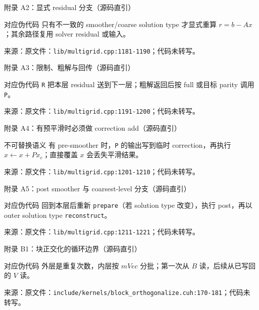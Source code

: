 \documentclass[UTF8,aspectratio=169,11pt]{ctexbeamer}
\newcommand{\source}[1]{\vspace{0.05em}\par{\raggedright\scriptsize\color{muted}来源：#1\par}}
\newcommand{\codepath}[1]{\nolinkurl{#1}}
\begin{document}
\begin{frame}[fragile,t]{附录 A2：显式 residual 分支（源码直引）}
  
  \begin{block}{对应伪代码}
    只有不一致的 smoother/coarse solution type 才显式重算 \(r=b-Ax\)；其余路径复用 solver residual 或输入。
  \end{block}
  \source{原文件：\codepath{lib/multigrid.cpp:1181-1190}；代码未转写。}
\end{frame}

\begin{frame}[fragile,t]{附录 A3：限制、粗解与回传（源码直引）}
  
  \begin{block}{对应伪代码}
    \texttt{R} 把本层 residual 送到下一层；粗解返回后按 full 或目标 parity 调用 \texttt{P}。
  \end{block}
  \source{原文件：\codepath{lib/multigrid.cpp:1191-1200}；代码未转写。}
\end{frame}

\begin{frame}[fragile,t]{附录 A4：有预平滑时必须做 correction add（源码直引）}
  
  \begin{alertblock}{不可替换语义}
    有 pre-smoother 时，\texttt{P} 的输出写到临时 correction，再执行 \(x\leftarrow x+Px_c\)；直接覆盖 \(x\) 会丢失平滑结果。
  \end{alertblock}
  \source{原文件：\codepath{lib/multigrid.cpp:1201-1210}；代码未转写。}
\end{frame}

\begin{frame}[fragile,t]{附录 A5：post smoother 与 coarsest-level 分支（源码直引）}
  
  \begin{block}{对应伪代码}
    回到本层后重新 \texttt{prepare}（若 solution type 改变），执行 post，再以 outer solution type \texttt{reconstruct}。
  \end{block}
  \source{原文件：\codepath{lib/multigrid.cpp:1211-1221}；代码未转写。}
\end{frame}

\begin{frame}[fragile,t]{附录 B1：块正交化的循环边界（源码直引）}
  
  \begin{block}{对应伪代码}
    外层是重复次数，内层按 \(mVec\) 分批；第一次从 \(B\) 读，后续从已写回的 \(V\) 读。
  \end{block}
  \source{原文件：\codepath{include/kernels/block_orthogonalize.cuh:170-181}；代码未转写。}
\end{frame}
\end{document}
